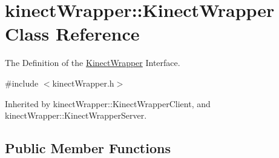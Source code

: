 \section{kinect\+Wrapper\+:\+:Kinect\+Wrapper Class Reference}
\label{classkinectWrapper_1_1KinectWrapper}


The Definition of the \hyperlink{classkinectWrapper_1_1KinectWrapper}{Kinect\+Wrapper} Interface.  




{\ttfamily \#include $<$kinect\+Wrapper.\+h$>$}



Inherited by kinect\+Wrapper\+::\+Kinect\+Wrapper\+Client, and kinect\+Wrapper\+::\+Kinect\+Wrapper\+Server.

\subsection*{Public Member Functions}
